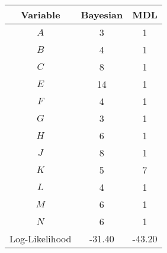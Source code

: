 \scriptsize
\begin{tabular}{@{}ccc@{}}
\toprule
Variable   & Bayesian & MDL          \\
\midrule
$A$    & 3        & 1      \\
$B$    & 4        & 1      \\
$C$    & 8        & 1      \\
$E$    & 14       & 1      \\
$F$    & 4        & 1      \\
$G$    & 3        & 1      \\
$H$    & 6        & 1      \\
$J$    & 8        & 1      \\
$K$    & 5        & 7      \\
$L$    & 4        & 1      \\
$M$    & 6        & 1      \\
$N$    & 6        & 1      \\
\addlinespace[0.5em]
Log-Likelihood   & -31.40   & -43.20 \\
\bottomrule
\end{tabular}
